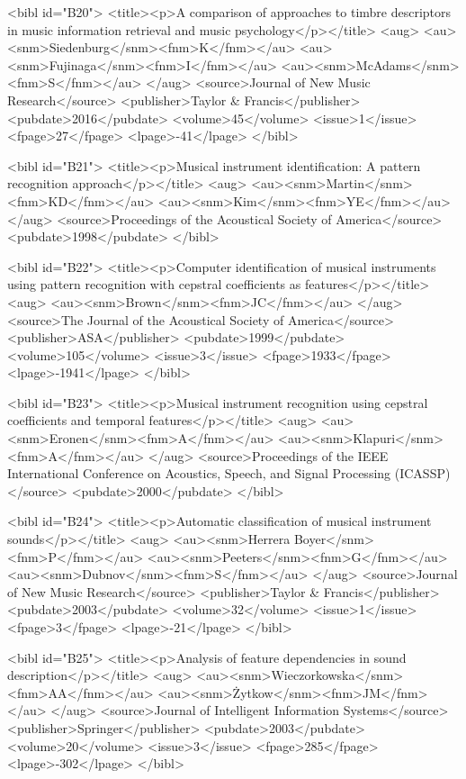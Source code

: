 \documentclass{bmcart}
\begin{document}
\begin{backmatter}
{<bibl id="B20">
  <title><p>A comparison of approaches to timbre descriptors in music
  information retrieval and music psychology</p></title>
  <aug>
    <au><snm>Siedenburg</snm><fnm>K</fnm></au>
    <au><snm>Fujinaga</snm><fnm>I</fnm></au>
    <au><snm>McAdams</snm><fnm>S</fnm></au>
  </aug>
  <source>Journal of New Music Research</source>
  <publisher>Taylor \& Francis</publisher>
  <pubdate>2016</pubdate>
  <volume>45</volume>
  <issue>1</issue>
  <fpage>27</fpage>
  <lpage>-41</lpage>
</bibl>

<bibl id="B21">
  <title><p>Musical instrument identification: A pattern recognition
  approach</p></title>
  <aug>
    <au><snm>Martin</snm><fnm>KD</fnm></au>
    <au><snm>Kim</snm><fnm>YE</fnm></au>
  </aug>
  <source>Proceedings of the Acoustical Society of America</source>
  <pubdate>1998</pubdate>
</bibl>

<bibl id="B22">
  <title><p>Computer identification of musical instruments using pattern
  recognition with cepstral coefficients as features</p></title>
  <aug>
    <au><snm>Brown</snm><fnm>JC</fnm></au>
  </aug>
  <source>The Journal of the Acoustical Society of America</source>
  <publisher>ASA</publisher>
  <pubdate>1999</pubdate>
  <volume>105</volume>
  <issue>3</issue>
  <fpage>1933</fpage>
  <lpage>-1941</lpage>
</bibl>

<bibl id="B23">
  <title><p>Musical instrument recognition using cepstral coefficients and
  temporal features</p></title>
  <aug>
    <au><snm>Eronen</snm><fnm>A</fnm></au>
    <au><snm>Klapuri</snm><fnm>A</fnm></au>
  </aug>
  <source>Proceedings of the IEEE International Conference on Acoustics,
  Speech, and Signal Processing (ICASSP)</source>
  <pubdate>2000</pubdate>
</bibl>

<bibl id="B24">
  <title><p>Automatic classification of musical instrument sounds</p></title>
  <aug>
    <au><snm>Herrera Boyer</snm><fnm>P</fnm></au>
    <au><snm>Peeters</snm><fnm>G</fnm></au>
    <au><snm>Dubnov</snm><fnm>S</fnm></au>
  </aug>
  <source>Journal of New Music Research</source>
  <publisher>Taylor \& Francis</publisher>
  <pubdate>2003</pubdate>
  <volume>32</volume>
  <issue>1</issue>
  <fpage>3</fpage>
  <lpage>-21</lpage>
</bibl>

<bibl id="B25">
  <title><p>Analysis of feature dependencies in sound description</p></title>
  <aug>
    <au><snm>Wieczorkowska</snm><fnm>AA</fnm></au>
    <au><snm>{\.Z}ytkow</snm><fnm>JM</fnm></au>
  </aug>
  <source>Journal of Intelligent Information Systems</source>
  <publisher>Springer</publisher>
  <pubdate>2003</pubdate>
  <volume>20</volume>
  <issue>3</issue>
  <fpage>285</fpage>
  <lpage>-302</lpage>
</bibl>

}
\end{backmatter}
\end{document}
